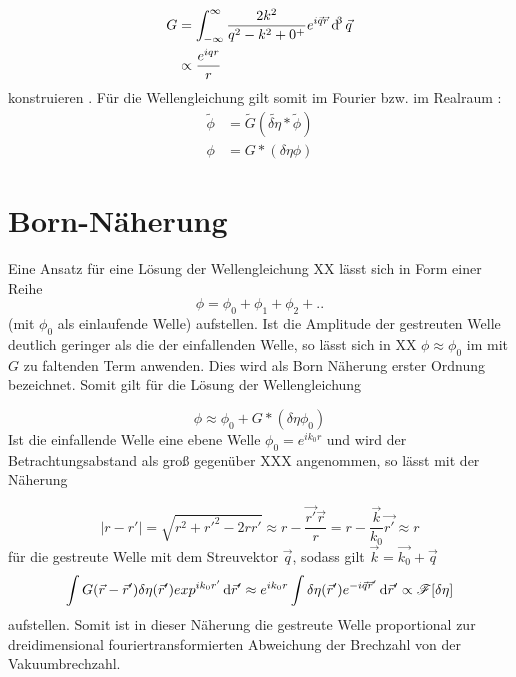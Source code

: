 \begin{align}
G&=\int_{-\infty}^{\infty} \frac{2k^2}{q^2-k^2+0^+} e^{i\vec{q}\vec{r}}\dif^3 \vec{q}\nonumber\\
&\propto\frac{e^{iqr}}{r}
\end{align}
konstruieren \cite{trigg2006}. Für die Wellengleichung gilt somit im Fourier bzw. im Realraum \cite{cowley1995,thibault2007}:
\begin{align}
\tilde{\phi}&=\tilde{G}(\tilde{\delta \eta} \ast \tilde{\phi})\\
\phi&={G}\ast({\delta \eta}  {\phi})
\end{align}

\section{Born-Näherung}
Eine Ansatz für eine Lösung der Wellengleichung XX lässt sich in Form einer Reihe
\begin{equation}
\phi=\phi_0+\phi_1+\phi_2+..
\end{equation}
(mit $\phi_0$ als einlaufende Welle) aufstellen. Ist die Amplitude der gestreuten Welle deutlich geringer als die der einfallenden Welle, so lässt sich in XX $\phi\approx\phi_0$ im mit $G$ zu faltenden Term anwenden. Dies wird als Born Näherung erster Ordnung bezeichnet. Somit gilt für die Lösung der Wellengleichung

\begin{equation}
\phi\approx\phi_0+G\ast({\delta \eta} \phi_0)
\end{equation}
Ist die einfallende Welle eine ebene Welle $\phi_0=e^{ik_0r}$ und wird der Betrachtungsabstand als groß gegenüber XXX angenommen, so lässt mit der Näherung

\begin{equation}
|r-r'|=\sqrt{r^2+r'^2-2rr'}\approx r-\frac{\vec{r'}\vec{r}}{r}=r-\frac{\vec{k}}{k_0}\vec{r'}\approx r
\end{equation}
für die gestreute Welle mit dem Streuvektor $\vec{q}$, sodass gilt $\vec{k}=\vec{k_0}+\vec{q}$
\begin{equation}
\int G(\vec{r}-\vec{r}')\delta\eta(\vec{r}') exp^{ik_0r'}  \dif \vec{r}'\approx e^{ik_0r}\int \delta\eta(\vec{r}')e^{-i\vec{q}\vec{r}'}\dif \vec{r}'\propto \mathscr{F}[\delta\eta]
\end{equation}
aufstellen. Somit ist in dieser Näherung die gestreute Welle proportional zur dreidimensional fouriertransformierten Abweichung der Brechzahl von der Vakuumbrechzahl.




